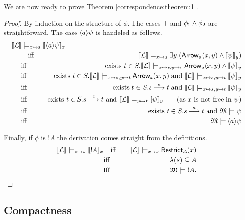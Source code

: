 \NI We are now ready to prove Theorem \ref{correspondence:theorem:1}.
\begin{proof}
By induction on the structure of $\phi$. The cases $\top$ and $\phi_1
\land \phi_2$ are straightfoward.  The case $\langle a \rangle \psi$ is handeled
as follows.
\begin{eqnarray*}
  \lefteqn{
  \SEMB{\LLL} \models_{x \mapsto s} \SEMB{\MAY{a}\psi}_x}\hspace{5mm} 
     \\
     &\quad \text{iff}\quad &
  \SEMB{\LLL} \models_{x \mapsto s} \exists y.(\ARROW{a}{x}{y} \AND \SEMB{\psi}_y) 
     \\
     &\text{iff}&
  \text{exists}\ t \in S. \SEMB{\LLL} \models_{x \mapsto s, y \mapsto t} \ARROW{a}{x}{y} \AND \SEMB{\psi}_y
     \\
     &\text{iff}&
  \text{exists}\ t \in S. \SEMB{\LLL} \models_{x \mapsto s, y \mapsto t} \ARROW{a}{x}{y} \ \text{and}\ \SEMB{\LLL} \models_{x \mapsto s, y \mapsto t}  \SEMB{\psi}_y
     \\
     &\text{iff}&
  \text{exists}\ t \in S. s \TRANS{a} t \ \text{and}\ \SEMB{\LLL} \models_{x \mapsto s, y \mapsto t}  \SEMB{\psi}_y
     \\
     &\text{iff}&
  \text{exists}\ t \in S. s \TRANS{a} t \ \text{and}\ \SEMB{\LLL} \models_{y \mapsto t}  \SEMB{\psi}_y \qquad (\text{as $x$ is not free in $\psi$})
     \\
     &\text{iff}&
  \text{exists}\ t \in S. s \TRANS{a} t \ \text{and}\ \MMM \models \psi
     \\
     &\text{iff}&
  \MMM \models \MAY{a}\psi  
\end{eqnarray*}

\NI Finally, if $\phi$ is $!A$ the derivation comes straight from the
definitions.
\begin{eqnarray*}
  \lbrack\!\lbrack \mathcal{L} \rbrack\!\rbrack \models_{x \mapsto s} \lbrack\!\lbrack !A \rbrack\!\rbrack_x
    &\quad \text{iff}\quad &
  \lbrack\!\lbrack \mathcal{L} \rbrack\!\rbrack \models_{x \mapsto s} \mathsf{Restrict}_{A}(x)
     \\
     &\text{iff}&
  \lambda(s) \subseteq A
     \\
     &\text{iff}&
  \frak{M} \models\ !A.
\end{eqnarray*}

\end{proof}

\subsection{Compactness}

